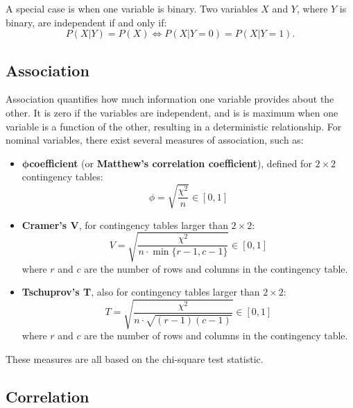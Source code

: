 A special case is when one variable is binary. Two variables $X$ and $Y$, where $Y$ is binary, are independent if and only if:
\begin{equation*}
    P(X|Y) = P(X) \iff P(X|Y = 0) = P(X|Y = 1) .
\end{equation*}

\subsection{Association}

Association quantifies how much information one variable provides about the other. It is zero if the variables are independent, and is is maximum when one variable is a function of the other, resulting in a deterministic relationship. For nominal variables, there exist several measures of association, such as:
\begin{itemize}
    \item $\boldsymbol{\phi} $\textbf{coefficient} (or \textbf{Matthew's correlation coefficient}), defined for $2 \times 2$ contingency tables:
    \begin{equation*}
        \phi = \sqrt{\frac{\chi^2}{n}} \in [0,1]
    \end{equation*}
    \item \textbf{Cramer's V}, for contingency tables larger than $2 \times 2$:
    \begin{equation*}
        V = \sqrt{\frac{\chi^2}{n \cdot \min \{ r-1, c-1 \}}} \in [0,1]
    \end{equation*}
    where $r$ and $c$ are the number of rows and columns in the contingency table.
    \item \textbf{Tschuprov's T}, also for contingency tables larger than $2 \times 2$:
    \begin{equation*}
        T = \sqrt{\frac{\chi^2}{n \cdot \sqrt{(r-1)(c-1)}}} \in [0,1]
    \end{equation*}
    where $r$ and $c$ are the number of rows and columns in the contingency table.
\end{itemize}
These measures are all based on the chi-square test statistic.

\subsection{Correlation}

